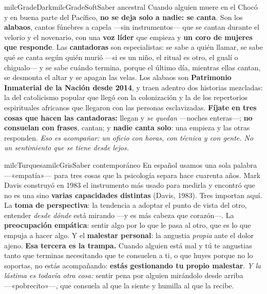 \documentclass[11pt,letterpaper]{article}
\begin{document}
\begin{softbox}{milcGradeDark}{milcGradeSoft}{Saber ancestral}
Cuando alguien muere en el Chocó y en buena parte del Pacífico, \textbf{no se deja solo a nadie: se canta}. Son los \textbf{alabaos}, cantos fúnebres a capela ---sin instrumentos--- que se cantan durante el velorio y el novenario, con una \textbf{voz líder} que empieza y \textbf{un coro de mujeres que responde}. Las \textbf{cantadoras} son especialistas: se sabe a quién llamar, se sabe qué se canta según quién murió ---si es un niño, el ritual es otro, el gualí o chigualo--- y se sabe cuándo termina, porque el último día, mientras ellas cantan, se desmonta el altar y se apagan las velas. Los alabaos son \textbf{Patrimonio Inmaterial de la Nación desde 2014}, y traen adentro dos historias mezcladas: la del catolicismo popular que llegó con la colonización y la de los repertorios espirituales africanos que llegaron con las personas esclavizadas. \textbf{Fíjate en tres cosas que hacen las cantadoras:} llegan y \emph{se quedan} ---noches enteras---; \textbf{no consuelan con frases}, cantan; y \textbf{nadie canta solo}: una empieza y las otras responden. \emph{Eso es acompañar: un oficio con horas, con técnica y con gente. No un sentimiento que se tiene desde lejos.}
\end{softbox}

\begin{softbox}{milcTurquesa}{milcGris}{Saber contemporáneo}
En español usamos una sola palabra ---«empatía»--- para tres cosas que la psicología separa hace cuarenta años. Mark Davis construyó en 1983 el instrumento más usado para medirla y encontró que no es una sino \textbf{varias capacidades distintas} (Davis, 1983). Tres importan aquí. La \textbf{toma de perspectiva}: la tendencia a adoptar el punto de vista del otro, entender \emph{desde dónde} está mirando ---y es más cabeza que corazón---. La \textbf{preocupación empática}: sentir algo por lo que le pasa al otro, que es lo que empuja a hacer algo. Y el \textbf{malestar personal}: la angustia \emph{propia} ante el dolor ajeno. \textbf{Esa tercera es la trampa.} Cuando alguien está mal y tú te angustias tanto que terminas necesitando que te consuelen a ti, o que huyes porque no lo soportas, no estás acompañando: \textbf{estás gestionando tu propio malestar}. \emph{Y la lástima es todavía otra cosa:} sentir pena por alguien mirándolo desde arriba ---«pobrecito»---, que consuela al que la siente y humilla al que la recibe.
\end{softbox}
\end{document}
